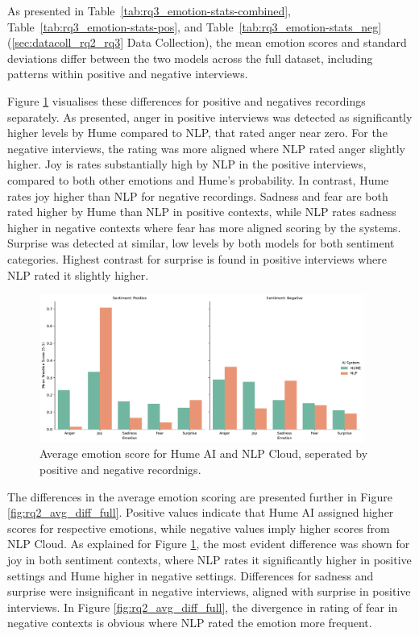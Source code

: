 As presented in Table~\ref{tab:rq3_emotion-stats-combined}, Table~\ref{tab:rq3_emotion-stats-pos}, and Table~\ref{tab:rq3_emotion-stats_neg} (\ref{sec:datacoll_rq2_rq3} Data Collection),
the mean emotion scores and standard deviations differ between the two models across the full dataset,
including patterns within positive and negative interviews. 

Figure \ref{fig:rq2_sent_grouped_bar} visualises these differences for positive and negatives recordings separately. As presented, anger in positive interviews was detected as significantly higher levels by Hume compared to NLP, 
that rated anger near zero. For the negative interviews, the rating was more aligned where NLP rated anger slightly higher. Joy is rates substantially high by NLP in the positive interviews, compared to both other emotions and Hume’s probability. 
In contrast, Hume rates joy higher than NLP for negative recordings. Sadness and fear are both rated higher by Hume than NLP in positive contexts, while NLP rates sadness higher in negative contexts where fear has more aligned scoring by the systems. 
Surprise was detected at similar, low levels by both models for both sentiment categories. 
Highest contrast for surprise is found in positive interviews where NLP rated it slightly higher.  

\begin{figure}[!h]
    \centering 
    \includegraphics[width=0.95\textwidth]{png/results/rq2/sentiment_comparison_facet_all.pdf}
    \caption{Average emotion score for Hume AI and NLP Cloud, seperated by positive and negative recordnigs.}
    \label{fig:rq2_sent_grouped_bar}
\end{figure}

The differences in the average emotion scoring are presented further in Figure \ref{fig:rq2_avg_diff_full}. Positive values indicate that Hume AI assigned higher scores for respective emotions, while negative values imply higher scores from NLP Cloud. 
As explained for Figure \ref{fig:rq2_sent_grouped_bar}, the most evident difference was shown for joy in both sentiment contexts, where NLP rates it significantly higher in positive settings and Hume higher in negative settings. 
Differences for sadness and surprise were insignificant in negative interviews, aligned with surprise in positive interviews. 
In Figure \ref{fig:rq2_avg_diff_full}, the divergence in rating of fear in negative contexts is obvious where NLP rated the emotion more frequent. 

